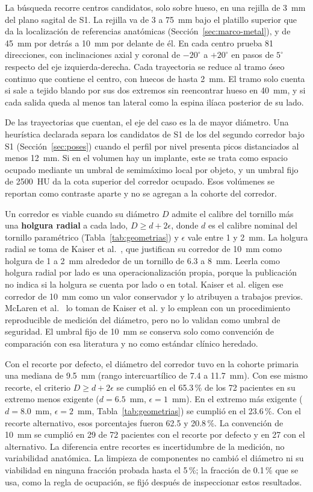 La búsqueda recorre centros candidatos, solo sobre hueso, en una rejilla de 3~mm del plano sagital de S1. La rejilla va de 3 a 75~mm bajo el platillo superior que da la localización de referencias anatómicas (Sección~\ref{sec:marco-metal}), y de 45~mm por detrás a 10~mm por delante de él. En cada centro prueba 81 direcciones, con inclinaciones axial y coronal de $-20^{\circ}$ a $+20^{\circ}$ en pasos de $5^{\circ}$ respecto del eje izquierda-derecha. Cada trayectoria se reduce al tramo óseo continuo que contiene el centro, con huecos de hasta 2~mm. El tramo solo cuenta si sale a tejido blando por sus dos extremos sin reencontrar hueso en 40~mm, y si cada salida queda al menos tan lateral como la espina ilíaca posterior de su lado.

De las trayectorias que cuentan, el eje del caso es la de mayor diámetro. Una heurística declarada separa los candidatos de S1 de los del segundo corredor bajo S1 (Sección~\ref{sec:poses}) cuando el perfil por nivel presenta picos distanciados al menos 12~mm. Si en el volumen hay un implante, este se trata como espacio ocupado mediante un umbral de semimáximo local por objeto, y un umbral fijo de 2500~HU da la cota superior del corredor ocupado. Esos volúmenes se reportan como contraste aparte y no se agregan a la cohorte del corredor.

Un corredor es viable cuando su diámetro $D$ admite el calibre del tornillo más una \textbf{holgura radial} a cada lado, $D \geq d + 2\epsilon$, donde $d$ es el calibre nominal del tornillo paramétrico (Tabla~\ref{tab:geometrias}) y $\epsilon$ vale entre 1 y 2~mm. La holgura radial se toma de Kaiser et al.~\cite{kaiser2014dysmorphism}, que justifican su corredor de 10~mm como holgura de 1 a 2~mm alrededor de un tornillo de 6.3 a 8~mm. Leerla como holgura radial por lado es una operacionalización propia, porque la publicación no indica si la holgura se cuenta por lado o en total. Kaiser et al. eligen ese corredor de 10~mm como un valor conservador y lo atribuyen a trabajos previos. McLaren et al.~\cite{mclaren2021corridor} lo toman de Kaiser et al. y lo emplean con un procedimiento reproducible de medición del diámetro, pero no lo validan como umbral de seguridad. El umbral fijo de 10~mm se conserva solo como convención de comparación con esa literatura y no como estándar clínico heredado.

Con el recorte por defecto, el diámetro del corredor tuvo en la cohorte primaria una mediana de 9.5~mm (rango intercuartílico de 7.4 a 11.7~mm). Con ese mismo recorte, el criterio $D \geq d + 2\epsilon$ se cumplió en el 65.3\,\% de los 72 pacientes en su extremo menos exigente ($d = 6.5$~mm, $\epsilon = 1$~mm). En el extremo más exigente ($d = 8.0$~mm, $\epsilon = 2$~mm, Tabla~\ref{tab:geometrias}) se cumplió en el 23.6\,\%. Con el recorte alternativo, esos porcentajes fueron 62.5 y 20.8\,\%. La convención de 10~mm se cumplió en 29 de 72 pacientes con el recorte por defecto y en 27 con el alternativo. La diferencia entre recortes es incertidumbre de la medición, no variabilidad anatómica. La limpieza de componentes no cambió el diámetro ni su viabilidad en ninguna fracción probada hasta el 5\,\%; la fracción de 0.1\,\% que se usa, como la regla de ocupación, se fijó después de inspeccionar estos resultados.

